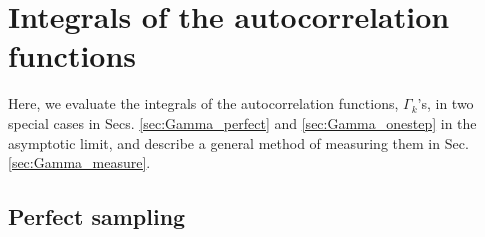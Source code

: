 \documentclass[reprint, superscriptaddress, floatfix]{revtex4-1}
\begin{document}
\section{\label{sec:Gamma}
Integrals of the autocorrelation functions}



Here, we evaluate the integrals of
the autocorrelation functions,
$\Gamma_k$'s,
in two special cases
in Secs. \ref{sec:Gamma_perfect}
and \ref{sec:Gamma_onestep}
in the asymptotic limit,
and describe a general method of measuring them
in Sec. \ref{sec:Gamma_measure}.



\subsection{\label{sec:Gamma_perfect}
Perfect sampling}
\end{document}
